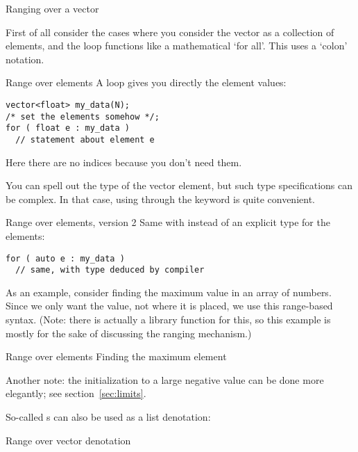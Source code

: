  {Ranging over a vector}

First of all consider the cases where you consider the vector as a
collection of elements, and the loop functions like a mathematical
`for all'.
This uses a `colon' notation.

\begin{block}{Range over elements}
  \label{sl:vector-range1}
  A  loop
  gives you directly the element values:
\begin{lstlisting}
vector<float> my_data(N);
/* set the elements somehow */;
for ( float e : my_data )
  // statement about element e
\end{lstlisting}
Here there are no indices because you don't need them.
\end{block}

You can spell out the type of the vector element, but such type
specifications can be complex.
In that case, using 
through the  keyword
is quite convenient.

\begin{block}{Range over elements, version 2}
  \label{sl:vector-range2}
  Same with  instead of
  an explicit type for the elements:
\begin{lstlisting}
for ( auto e : my_data )
  // same, with type deduced by compiler
\end{lstlisting}
\end{block}

As an example, consider finding the maximum value
in an array of numbers.
Since we only want the value, not where it is placed,
we use this range-based syntax.
(Note: there is actually a library function for this,
so this example is mostly for the sake of discussing the ranging mechanism.)

\begin{block}{Range over elements}
  \label{sl:vector-range3}
  Finding the maximum element
\end{block}

Another note: the initialization to a large negative value
can be done more elegantly; see section~\ref{sec:limits}.

So-called s
can also be used as a list denotation:

\begin{block}{Range over vector denotation}
  \label{sl:range-denote}
\end{block}

